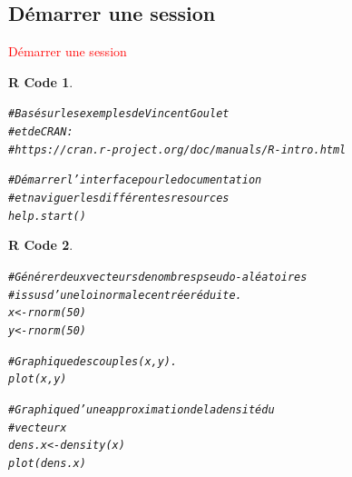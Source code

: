 \documentclass[11pt]{beamer}\usepackage[]{graphicx}\usepackage[]{color}
\makeatletter
\newcommand{\hlnum}[1]{\textcolor[rgb]{0.063,0.58,0.627}{#1}}%
\newcommand{\hlcom}[1]{\textcolor[rgb]{0.588,0.588,0.588}{#1}}%
\newcommand{\hlstd}[1]{\textcolor[rgb]{0.196,0.196,0.196}{#1}}%
\newcommand{\hlkwb}[1]{\textcolor[rgb]{0.627,0,0.314}{#1}}%
\newcommand{\hlkwd}[1]{\textcolor[rgb]{0.78,0.227,0.412}{#1}}%
\newenvironment{kframe}{%
 \def\at@end@of@kframe{}%
 \ifinner\ifhmode%
  \def\at@end@of@kframe{\end{minipage}}%
  \begin{minipage}{\columnwidth}%
 \fi\fi%
 \def\FrameCommand##1{\hskip\@totalleftmargin \hskip-\fboxsep
 \colorbox{shadecolor}{##1}\hskip-\fboxsep
     \hskip-\linewidth \hskip-\@totalleftmargin \hskip\columnwidth}%
 \MakeFramed {\advance\hsize-\width
   \@totalleftmargin\z@ \linewidth\hsize
   \@setminipage}}%
 {\par\unskip\endMakeFramed%
 \at@end@of@kframe}
\newenvironment{knitrout}{}{} %
\newtheorem{rcode}{R Code}[section]
\makeatother
\begin{document}
\subsection{D\'{e}marrer une session}

\begin{frame}
 \begin{center}
  \Huge{\textcolor{red}{D\'{e}marrer une session}}
 \end{center}
\end{frame}


\begingroup
\makeatletter
\setlength{\hoffset}{-.5\beamer@sidebarwidth}
\makeatother
\begin{frame}
\begin{knitrout}
\color{fgcolor}\begin{kframe}
\begin{rcode}\label{unnamed-chunk-2}\hfill{}\begin{alltt}
\hlcom{# Basé sur les exemples de Vincent Goulet}
\hlcom{# et de CRAN:}
\hlcom{# https://cran.r-project.org/doc/manuals/R-intro.html}

\hlcom{# Démarrer l'interface pour le documentation}
\hlcom{# et naviguer les différentes resources}
\hlkwd{help.start}\hlstd{()}
\end{alltt}
\end{rcode}\end{kframe}
\end{knitrout}
\end{frame}

\begin{frame}
\begin{knitrout}
\color{fgcolor}\begin{kframe}
\begin{rcode}\label{unnamed-chunk-3}\hfill{}\begin{alltt}
\hlcom{# Générer deux vecteurs de nombres pseudo-aléatoires}
\hlcom{# issus d’une loi normale centrée réduite.}
\hlstd{x} \hlkwb{<-} \hlkwd{rnorm}\hlstd{(}\hlnum{50}\hlstd{)}
\hlstd{y} \hlkwb{<-} \hlkwd{rnorm}\hlstd{(}\hlnum{50}\hlstd{)}

\hlcom{# Graphique des couples (x, y).}
\hlkwd{plot}\hlstd{(x, y)}

\hlcom{# Graphique d’une approximation de la densité du }
\hlcom{# vecteur x}
\hlstd{dens.x} \hlkwb{<-} \hlkwd{density}\hlstd{(x)}
\hlkwd{plot}\hlstd{(dens.x)}
\end{alltt}
\end{rcode}\end{kframe}
\end{knitrout}
\end{frame}
\end{document}
